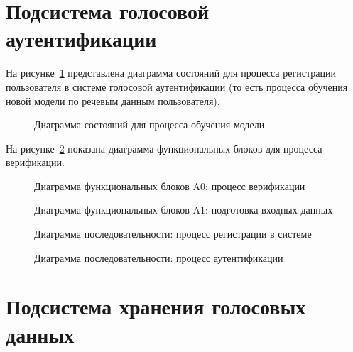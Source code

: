 \section{Подсистема голосовой аутентификации}

На рисунке~\ref{fig:fsm_learning} представлена диаграмма состояний для процесса регистрации пользователя в системе голосовой аутентификации (то есть процесса обучения новой модели по речевым данным пользователя).

\begin{figure}
    \caption{Диаграмма состояний для процесса обучения модели}
    \label{fig:fsm_learning}
\end{figure}

На рисунке~\ref{fig:idef0_main} показана диаграмма функциональных блоков для процесса верификации.

\begin{figure}
    \caption{Диаграмма функциональных блоков A0: процесс верификации}
    \label{fig:idef0_main}
\end{figure}

\begin{figure}
    \caption{Диаграмма функциональных блоков A1: подготовка входных данных}
    \label{fig:idef0_pre}
\end{figure}

\begin{figure}
    \center{
    
    }
    \caption{Диаграмма последовательности: процесс регистрации в системе}
    \label{fig:seq_enrollment}
\end{figure}


\begin{figure}
    \center{
    
    }
    \caption{Диаграмма последовательности: процесс аутентификации}
    \label{fig:seq_verification}
\end{figure}

\section{Подсистема хранения голосовых данных}

